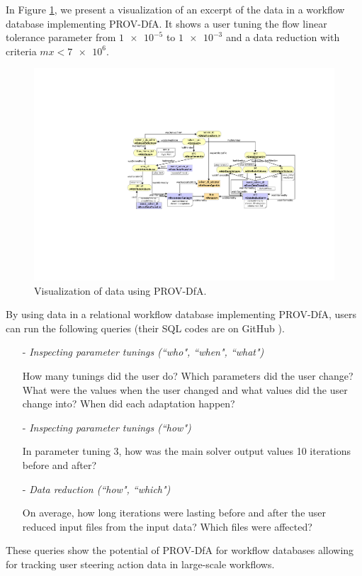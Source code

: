 In Figure \ref{fig:visualization_using_provdfa},
we present a visualization of an excerpt of the data in a workflow database
implementing PROV-DfA.
It shows a user tuning the flow linear tolerance parameter from $\num{1e-5}$ to
$\num{1e-3}$ and a data reduction with criteria $mx < \num{7e6}$.


\begin{figure}
    \centering
    \includegraphics[width=\textwidth,keepaspectratio]{img/PROV-DFA-EXAMPLE.pdf}
    \caption{Visualization of data using PROV-DfA.}
    \label{fig:visualization_using_provdfa}
\end{figure}


By using data in a relational workflow database implementing PROV-DfA,
users can run the following queries (their SQL codes are on GitHub \cite{PROV-DfA_GitHub}).


\begin{itemize}
    \setlength\itemsep{-2mm}
    \item[-] \noindent
    \textit{Inspecting parameter tunings (``who", ``when", ``what")}

    How many tunings did the user do? Which parameters did the user change?
    What were the values when the user changed and what values did the user change into?
    When did each adaptation happen?

    \item[-] \noindent
    \textit{Inspecting parameter tunings (``how")}

    In parameter tuning 3, how was the main solver output values 10 iterations before and after?

    \item[-] \noindent
    \textit{Data reduction (``how", ``which")}

    On average, how long iterations were lasting before and after the user
    reduced input files from the input data? Which files were affected?

\end{itemize}

These queries show the potential of PROV-DfA for workflow databases allowing for tracking user steering action data in large-scale workflows.

